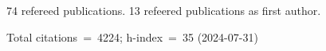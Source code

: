 74 refereed publications. 13 refeered publications as first author.

Total citations~=~4224; h-index~=~35 (2024-07-31)